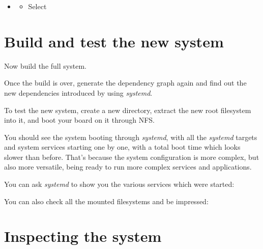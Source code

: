 \begin{itemize}
\begin{itemize}
\begin{itemize}
    \item Select 
    \end{itemize}
  \item {}
    \begin{itemize}
    \item Select , a lightweight SSH server used instead
          of OpenSSH in most embedded devices. You don't need to enable
          client support (building an SSH client).
    \end{itemize}
  \end{itemize}
\item {}
  \begin{itemize}
     \item Select 
  \end{itemize}
\end{itemize}

\section{Build and test the new system}

Now build the full system.

Once the build is over, generate the dependency graph again and find out
the new dependencies introduced by using {\em systemd}.

To test the new system, create a new  directory, extract
the new root filesystem into it, and boot your board on it through NFS.

You should see the system booting through {\em systemd}, with all the
{\em systemd} targets and system services starting one by one, with a
total boot time which looks slower than before. That's because the
system configuration is more complex, but also more versatile, being
ready to run more complex services and applications.

You can ask {\em systemd} to show you the various services which were
started:


You can also check all the mounted filesystems and be impressed:


\section{Inspecting the system}

